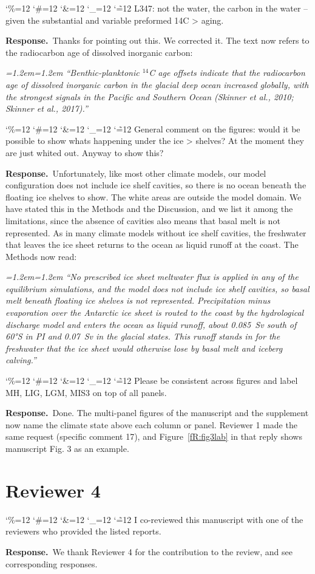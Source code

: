 \documentclass[11pt,a4paper]{article}
\newcommand{\reviewer}[1]{\section*{#1}}
\newcommand{\comment}[1]{\par\medskip\noindent\color{black}\begingroup\catcode`\%=12 \catcode`\#=12 \catcode`\&=12 \catcode`\_=12 \catcode`\~=12 \commentbody}
\newcommand{\commentbody}[1]{#1\endgroup\par\smallskip}
\newcommand{\response}{\par\noindent\color{chgcol}\textbf{Response.}\ }
\newenvironment{change}{\par\smallskip\color{chgcol}\small\itshape\leftskip=1.2em\rightskip=1.2em\noindent\ignorespaces}{\par\smallskip}
\begin{document}
\comment{R3}{L347: not the water, the carbon in the water – given the substantial and variable preformed 14C > aging.}

\response Thanks for pointing out this. We corrected it. The text now refers to the radiocarbon age of dissolved inorganic carbon:

\begin{change}
``Benthic-planktonic $^{14}$C age offsets indicate that the radiocarbon age of dissolved inorganic carbon in the glacial deep ocean increased globally, with the strongest signals in the Pacific and Southern Ocean (Skinner et al., 2010; Skinner et al., 2017).''
\end{change}


 \comment{R3}{General comment on the figures: would it be possible to show whats happening under the ice > shelves? At the moment they are just whited out. Anyway to show this?}
\response Unfortunately, like most other climate models, our model configuration does not include ice shelf cavities, so there is no ocean beneath the floating ice shelves to show. The white areas are outside the model domain. We have stated this in the Methods and the Discussion, and we list it among the limitations, since the absence of cavities also means that basal melt is not represented. As in many climate models without ice shelf cavities, the freshwater that leaves the ice sheet returns to the ocean as liquid runoff at the coast. The Methods now read:

\begin{change}
``No prescribed ice sheet meltwater flux is applied in any of the equilibrium simulations, and the model does not include ice shelf cavities, so basal melt beneath floating ice shelves is not represented. Precipitation minus evaporation over the Antarctic ice sheet is routed to the coast by the hydrological discharge model and enters the ocean as liquid runoff, about 0.085~Sv south of 60°S in PI and 0.07~Sv in the glacial states. This runoff stands in for the freshwater that the ice sheet would otherwise lose by basal melt and iceberg calving.''
\end{change}

\comment{R3}{Please be consistent across figures and label MH, LIG, LGM, MIS3 on top of all panels.}

\response Done. The multi-panel figures of the manuscript and the supplement now name the climate state above each column or panel. Reviewer 1 made the same request (specific comment 17), and Figure~\ref{fR:fig3lab} in that reply shows manuscript Fig. 3 as an example.


\reviewer{Reviewer 4}

\comment{R4}{I co-reviewed this manuscript with one of the reviewers who provided the listed reports.}

\response We thank Reviewer 4 for the contribution to the review, and see corresponding responses.
\end{document}
